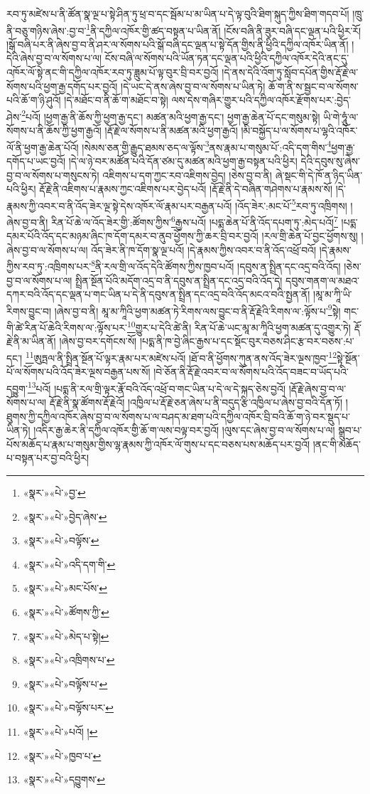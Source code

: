 རབ་ཏུ་མཛེས་པ་ནི་ཚོན་སྣ་ལྔ་པ་སྟེ་ཤིན་ཏུ་ཕྲ་བ་དང་སྦོམ་པ་མ་ཡིན་པ་དེ་ལྟ་བུའི་ཐིག་སྐུད་ཀྱིས་ཐིག་གདབ་པོ། །ཁྲུ་ནི་བཅུ་གཉིས་ཞེས་:བྱ་བ་\footnote{«སྣར་»«པེ་»བྱ་}ནི་དཀྱིལ་འཁོར་གྱི་ཚད་བསྟན་པ་ཡིན་ནོ། །ངོས་བཞི་ནི་ཟུར་བཞི་དང་ལྡན་པའི་ཕྱིར་རོ། །སྒོ་བཞི་པར་ནི་ཞེས་བྱ་བ་ནི་ཤར་ལ་སོགས་པའི་སྒོ་བཞི་དང་ལྡན་པ་སྟེ་དོན་གྱིས་ནི་ཕྱིའི་དཀྱིལ་འཁོར་ཡིན་ནོ། །དེའི་ཞེས་བྱ་བ་ལ་སོགས་པ་ལ། ངོས་བཞི་ལ་སོགས་པའི་ཡོན་ཏན་དང་ལྡན་པའི་ཕྱིའི་དཀྱིལ་འཁོར་དེའི་ནང་དུ་འཁོར་ལོ་སྟེ་ནང་གི་དཀྱིལ་འཁོར་རབ་ཏུ་ཟླུམ་པོ་ལྟ་བུར་བྲི་བར་བྱའོ། །དེ་ནས་དེའི་འོག་ཏུ་སློབ་དཔོན་གྱིས་རྡོ་རྗེ་ལ་སོགས་པའི་ཕྱག་རྒྱ་དགོད་པར་བྱའོ། །དེ་ཡང་དེ་ནས་ཞེས་བྱ་བ་ལ་སོགས་པ་ཡིན་ཏེ། ཆོ་ག་ནི་ས་སྦྱང་བ་ལ་སོགས་པའི་ཆོ་ག་ཉི་ཤུའོ། །དེ་མཐོང་བ་ནི་ཆོ་ག་མཐོང་བ་སྟེ། ལས་དེས་གཞིར་གྱུར་པའི་དཀྱིལ་འཁོར་རྫོགས་པར་:བྱེད་ཤེས་\footnote{«སྣར་»«པེ་»བྱེད་ཞེས་}པའོ། །ཕྱག་རྒྱ་ནི་ཆོས་ཀྱི་ཕྱག་རྒྱ་དང་། མཚན་མའི་ཕྱག་རྒྱ་དང་། ཕྱག་རྒྱ་ཆེན་པོ་དང་གསུམ་སྟེ། ཡི་གེ་ཧཱུཾ་ལ་སོགས་པ་ནི་ཆོས་ཀྱི་ཕྱག་རྒྱའོ། །རྡོ་རྗེ་ལ་སོགས་པ་ནི་མཚན་མའི་ཕྱག་རྒྱའོ། །མི་བསྐྱོད་པ་ལ་སོགས་པ་ལྷའི་འཁོར་ལོ་ནི་ཕྱག་རྒྱ་ཆེན་པོའོ། །སེམས་ཅན་གྱི་རྒྱུད་ཐམས་ཅད་ལ་ལྟོས་\footnote{«སྣར་»«པེ་»བལྟོས་}ནས་རྣམ་པ་གསུམ་པོ་:འདི་དག་གིས་\footnote{«སྣར་»«པེ་»འདི་དག་གི་}ཕྱག་རྒྱ་དགོད་པ་ཡང་བྱའོ། །དེ་ལ་ཉེ་བར་མཚོན་པའི་དོན་ཙམ་དུ་མཚན་མའི་ཕྱག་རྒྱ་བསྟན་པའི་ཕྱིར། དེའི་དབུས་སུ་ཞེས་བྱ་བ་ལ་སོགས་པ་གསུངས་ཏེ། འཇིགས་པ་དག་ཀྱང་རབ་འཇིགས་བྱེད། །ཅེས་བྱ་བ་ནི། ཞེ་སྡང་གི་དེ་ཁོ་ན་ཉིད་ཡིན་པའི་ཕྱིར། རྡོ་རྗེ་ནི་འཇིགས་པ་རྣམས་ཀྱང་འཇིགས་པར་བྱེད་པའོ། །རྡོ་རྗེ་ནི་དེ་བཞིན་གཤེགས་པ་རྣམས་སོ། །དེ་རྣམས་ཀྱི་འབར་བ་ནི་འོད་ཟེར་ལྔ་སྟེ་དེས་འཁོར་ལོ་རྣམ་པར་བརྒྱན་པའོ། །འོད་ཟེར་:མང་པོ་\footnote{«སྣར་»«པེ་»མང་པོས་}རབ་ཏུ་འཁྲིགས། །ཞེས་བྱ་བ་ནི། རིན་པོ་ཆེ་ལ་འོད་ཟེར་གྱི་:ཚོགས་ཀྱིས་\footnote{«སྣར་»«པེ་»ཚོགས་ཀྱི་}རྒྱས་པའོ། །པདྨ་ཆེན་པོ་ནི་འོད་དཔག་ཏུ་:མེད་པའོ།\footnote{«སྣར་»«པེ་»མེད་པ་སྟེ།} །པདྨ་དམར་པོའི་འོད་དང་མཉམ་ཞིང་ཁ་དོག་དམར་བ་ནུབ་ཕྱོགས་ཀྱི་ཆར་བྲི་བར་བྱའོ། །རལ་གྲི་ཆེན་པོ་བྱང་ཕྱོགས་སུ། །ཞེས་བྱ་བ་ལ་སོགས་པ་ལ། འོད་ཟེར་ནི་ཁ་དོག་སྣ་ལྔ་པའོ། །དེ་རྣམས་ཀྱིས་འབར་བ་ནི་འོད་འཕྲོ་བའོ། །དེ་རྣམས་ཀྱིས་རབ་ཏུ་:འཁྲིགས་པར་\footnote{«སྣར་»«པེ་»འཁྲིགས་པ་}ནི་རལ་གྲི་ལ་འོད་དེའི་ཚོགས་ཀྱིས་ཁྱབ་པའོ། །དབུས་ན་སྤྲིན་དང་འདྲ་བའི་འོད། །ཅེས་བྱ་བ་ལ་སོགས་པ་ལ། སྤྲིན་སྔོན་པོའི་མདོག་འདྲ་བ་ནི་དབུས་ན་སྤྲིན་དང་འདྲ་བའི་འོད་དེ། དབུས་གནག་ལ་མཐའ་དཀར་བའི་འོད་དང་ལྡན་པ་གང་ཡིན་པ་དེ་ནི་དབུས་ན་སྤྲིན་དང་འདྲ་བའི་འོད་མངའ་བའི་སྤྱན་ནོ། །མཱ་མ་ཀཱི་ཡི་རིགས་བྱུང་བ། །ཞེས་བྱ་བ་ནི། མཱ་མ་ཀཱིའི་ཕྱག་མཚན་ཏེ་རིགས་ལས་བྱུང་བ་ནི་རྡོ་རྗེའི་རིགས་ལ་:ལྟོས་པ་\footnote{«སྣར་»«པེ་»བལྟོས་པ་}སྟེ། གང་གི་ཚེ་རིན་པོ་ཆེའི་རིགས་ལ་:ལྟོས་པར་\footnote{«སྣར་»«པེ་»བལྟོས་པར་}གྱུར་པ་དེའི་ཚེ་ནི། རིན་པོ་ཆེ་ཡང་མཱ་མ་ཀཱིའི་ཕྱག་མཚན་དུ་འགྱུར་ཏེ། རྡོ་རྗེ་ནི་མ་ཡིན་ནོ། །ཞེས་བྱ་བར་དགོངས་སོ། །པདྨ་ནི་ཁ་བྱེ་ཞིང་རྒྱས་པ་དང་སྡོང་བུར་བཅས་ཤིང་རྩ་བར་བཅས་:པ་དང་། \footnote{«སྣར་»«པེ་»པའོ། ། }ཨུཏྤལ་ནི་སྤྲིན་སྔོན་པོ་ལྟར་རྣམ་པར་མཛེས་པའོ། །ཐོ་བ་ནི་ཕྱོགས་ཀུན་ནས་འོད་ཟེར་ལྔས་ཁྱབ་\footnote{«སྣར་»«པེ་»ཁྱབ་པ་}སྟེ་སྔོན་པོ་ལ་སོགས་པའི་འོད་ཟེར་ལྔས་བརྒྱན་པས་སོ། །བེ་ཅོན་ནི་རྡོ་རྗེ་འབར་བ་ལ་སོགས་པའི་འོད་བཟང་བ་ཡོད་པའི་དབྱུག་\footnote{«སྣར་»«པེ་»དབྱུགས་}པའོ། །པདྨ་ནི་རལ་གྲི་ལྟར་རྣོ་བའི་འོད་འཕྲོ་བ་གང་ཡིན་པ་དེ་ལ་དེ་སྐད་ཅེས་བྱའོ། །རྡོ་རྗེ་ཞེས་བྱ་བ་ལ་སོགས་པ་ལ། རྡོ་རྗེ་ནི་སྣ་ཚོགས་རྡོ་རྗེའོ། །འཁྱིལ་པ་རྡོ་རྗེ་ཅན་ཞེས་པ་ནི་བདུད་རྩི་འཁྱིལ་པ་ཞེས་བྱ་བའི་དོན་ཏོ། །ཐུགས་ཀྱི་དཀྱིལ་འཁོར་ཞེས་བྱ་བ་ལ་སོགས་པ་ལ་བཤད་མ་ཐག་པའི་དཀྱིལ་འཁོར་བྲི་བའི་ཆོ་ག་ཉེ་བར་སྡུད་པ་ཡིན་ཏེ། །འདིར་རྒྱ་ཆེར་ནི་དཀྱིལ་འཁོར་གྱི་ཆོ་ག་ལས་བལྟ་བར་བྱའོ། །ལུས་དང་ཞེས་བྱ་བ་ལ་སོགས་པ་ལ། སྒྲུབ་པ་པོས་མཆོད་པ་རྣམ་པ་གསུམ་གྱིས་ལྷ་རྣམས་ཀྱི་འཁོར་ལོ་གུས་པ་དང་བཅས་པས་མཆོད་པར་བྱའོ། །ནང་གི་མཆོད་པ་བསྟན་པར་བྱ་བའི་ཕྱིར། 